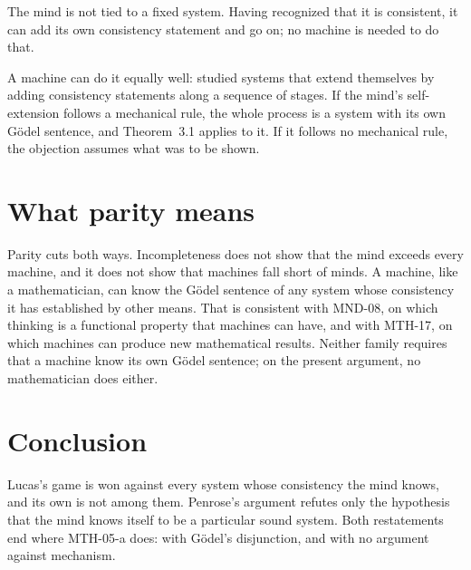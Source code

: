 \documentclass{situationist-preprint}
\begin{document}
\begin{objection}
The mind is not tied to a fixed system. Having recognized that it is consistent, it can add its own consistency statement and go on; no machine is needed to do that.
\end{objection}

\begin{reply}
A machine can do it equally well: \citet{Turing1939} studied systems that extend themselves by adding consistency statements along a sequence of stages. If the mind's self-extension follows a mechanical rule, the whole process is a system with its own G\"odel sentence, and Theorem~3.1 applies to it. If it follows no mechanical rule, the objection assumes what was to be shown.
\end{reply}

\section{What parity means}\label{s:means}

Parity cuts both ways. Incompleteness does not show that the mind exceeds every machine, and it does not show that machines fall short of minds. A machine, like a mathematician, can know the G\"odel sentence of any system whose consistency it has established by other means. That is consistent with MND-08, on which thinking is a functional property that machines can have, and with MTH-17, on which machines can produce new mathematical results. Neither family requires that a machine know its own G\"odel sentence; on the present argument, no mathematician does either.

\section{Conclusion}

Lucas's game is won against every system whose consistency the mind knows, and its own is not among them. Penrose's argument refutes only the hypothesis that the mind knows itself to be a particular sound system. Both restatements end where MTH-05-a does: with G\"odel's disjunction, and with no argument against mechanism.
\end{document}
